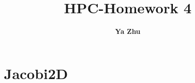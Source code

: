 \documentclass[11pt, oneside]{article}   	%
\title{\bf HPC-Homework 4}
\author{\bf \large Ya Zhu}
\date{}							%
\begin{document}
\maketitle 

\section{Jacobi2D}
\end{document}
